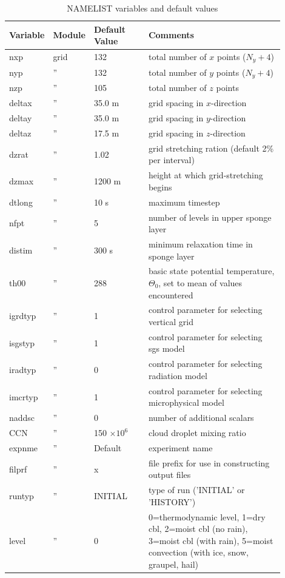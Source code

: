 \documentclass[11pt,a4paper]{article}
\begin{document}
\begin{longtable}[htb]{p{0.1\linewidth}p{0.1\linewidth}p{0.2\linewidth}p{0.5\linewidth}}
\caption{NAMELIST variables and default values}\\
\hline
\hline
Variable & Module & Default Value & Comments \\ 
\hline
\endhead
nxp & grid & 132 & total number of $x$ points ($N_y+4$) \\
nyp &  '' & 132 & total number of $y$ points ($N_y+4$) \\
nzp &  '' & 105 & total number of $z$ points \\
deltax & '' & 35.0 m & grid spacing in $x$-direction \\
deltay & '' & 35.0 m & grid spacing in $y$-direction \\
deltaz & '' & 17.5 m & grid spacing in $z$-direction \\
dzrat  & '' & 1.02   & grid stretching ration (default 2\% per
interval) \\
dzmax  & '' & 1200 m & height at which grid-stretching begins \\
dtlong & '' & 10 s  & maximum timestep \\
nfpt   & '' & 5      & number of levels in upper sponge layer \\
distim & '' & 300 s  & minimum relaxation time in sponge layer \\
th00   & '' & 288    & basic state potential temperature, $\Theta_0$, set to mean of values encountered \\
igrdtyp & '' & 1 & control parameter for selecting vertical grid \\
isgstyp & '' & 1 & control parameter for selecting sgs model \\
iradtyp & '' & 0 & control parameter for selecting radiation model \\
imcrtyp & '' & 1 & control parameter for selecting microphysical model \\
naddsc  & '' & 0 &  number of additional scalars \\
CCN     & '' & 150 $\times 10^{6}$ & cloud droplet mixing ratio \\
expnme  & '' & Default & experiment name \\
filprf  & '' & x & file prefix for use in constructing output files\\
runtyp  & '' & INITIAL & type of run ('INITIAL' or 'HISTORY') \\ 
level   & '' & 0 & 0=thermodynamic level, 1=dry cbl, 2=moist cbl (no rain), 3=moist cbl (with rain), 5=moist convection (with ice, snow, graupel, hail)\\

\end{longtable}
\end{document}
